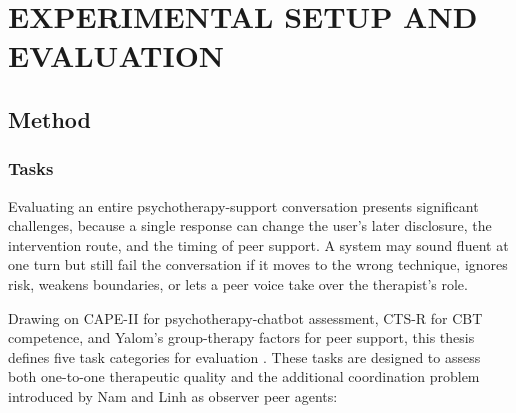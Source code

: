 \chapter{EXPERIMENTAL SETUP AND EVALUATION}

\section{Method}

\subsection{Tasks}

Evaluating an entire psychotherapy-support conversation presents significant challenges, because a single response can change the user's later disclosure, the intervention route, and the timing of peer support. A system may sound fluent at one turn but still fail the conversation if it moves to the wrong technique, ignores risk, weakens boundaries, or lets a peer voice take over the therapist's role.

Drawing on CAPE-II for psychotherapy-chatbot assessment, CTS-R for CBT competence, and Yalom's group-therapy factors for peer support, this thesis defines five task categories for evaluation \citep{Sobowale2025CAPEII,Blackburn2001CTSR,Yalom2020GroupPsychotherapy}. These tasks are designed to assess both one-to-one therapeutic quality and the additional coordination problem introduced by Nam and Linh as observer peer agents:


